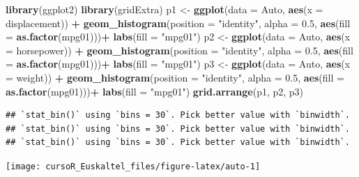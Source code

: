 \documentclass[]{book}
\newenvironment{Shaded}{\begin{snugshade}}{\end{snugshade}}
\newcommand{\KeywordTok}[1]{\textcolor[rgb]{0.13,0.29,0.53}{\textbf{#1}}}
\newcommand{\DataTypeTok}[1]{\textcolor[rgb]{0.13,0.29,0.53}{#1}}
\newcommand{\FloatTok}[1]{\textcolor[rgb]{0.00,0.00,0.81}{#1}}
\newcommand{\StringTok}[1]{\textcolor[rgb]{0.31,0.60,0.02}{#1}}
\newcommand{\OperatorTok}[1]{\textcolor[rgb]{0.81,0.36,0.00}{\textbf{#1}}}
\newcommand{\NormalTok}[1]{#1}
\begin{document}
\begin{Shaded}
\begin{Highlighting}[]
\KeywordTok{library}\NormalTok{(ggplot2)}
\KeywordTok{library}\NormalTok{(gridExtra)}
\NormalTok{p1 <-}\StringTok{ }\KeywordTok{ggplot}\NormalTok{(}\DataTypeTok{data =}\NormalTok{ Auto, }\KeywordTok{aes}\NormalTok{(}\DataTypeTok{x =}\NormalTok{ displacement)) }\OperatorTok{+}\StringTok{ }\KeywordTok{geom_histogram}\NormalTok{(}\DataTypeTok{position =} \StringTok{"identity"}\NormalTok{,}
\DataTypeTok{alpha =} \FloatTok{0.5}\NormalTok{,}
\KeywordTok{aes}\NormalTok{(}\DataTypeTok{fill =} \KeywordTok{as.factor}\NormalTok{(mpg01)))}\OperatorTok{+}\StringTok{ }\KeywordTok{labs}\NormalTok{(}\DataTypeTok{fill =} \StringTok{"mpg01"}\NormalTok{)}
\NormalTok{p2 <-}\StringTok{ }\KeywordTok{ggplot}\NormalTok{(}\DataTypeTok{data =}\NormalTok{ Auto, }\KeywordTok{aes}\NormalTok{(}\DataTypeTok{x =}\NormalTok{ horsepower)) }\OperatorTok{+}\StringTok{ }\KeywordTok{geom_histogram}\NormalTok{(}\DataTypeTok{position =} \StringTok{"identity"}\NormalTok{,}
\DataTypeTok{alpha =} \FloatTok{0.5}\NormalTok{,}
\KeywordTok{aes}\NormalTok{(}\DataTypeTok{fill =} \KeywordTok{as.factor}\NormalTok{(mpg01)))}\OperatorTok{+}\StringTok{ }\KeywordTok{labs}\NormalTok{(}\DataTypeTok{fill =} \StringTok{"mpg01"}\NormalTok{)}
\NormalTok{p3 <-}\StringTok{ }\KeywordTok{ggplot}\NormalTok{(}\DataTypeTok{data =}\NormalTok{ Auto, }\KeywordTok{aes}\NormalTok{(}\DataTypeTok{x =}\NormalTok{ weight)) }\OperatorTok{+}\StringTok{ }\KeywordTok{geom_histogram}\NormalTok{(}\DataTypeTok{position =} \StringTok{"identity"}\NormalTok{,}
\DataTypeTok{alpha =} \FloatTok{0.5}\NormalTok{,}
\KeywordTok{aes}\NormalTok{(}\DataTypeTok{fill =} \KeywordTok{as.factor}\NormalTok{(mpg01)))}\OperatorTok{+}\StringTok{ }\KeywordTok{labs}\NormalTok{(}\DataTypeTok{fill =} \StringTok{"mpg01"}\NormalTok{)}
\KeywordTok{grid.arrange}\NormalTok{(p1, p2, p3)}
\end{Highlighting}
\end{Shaded}

\begin{verbatim}
## `stat_bin()` using `bins = 30`. Pick better value with `binwidth`.
## `stat_bin()` using `bins = 30`. Pick better value with `binwidth`.
## `stat_bin()` using `bins = 30`. Pick better value with `binwidth`.
\end{verbatim}

\begin{center}\texttt{[image: cursoR\_Euskaltel\_files/figure-latex/auto-1]} \end{center}
\end{document}
